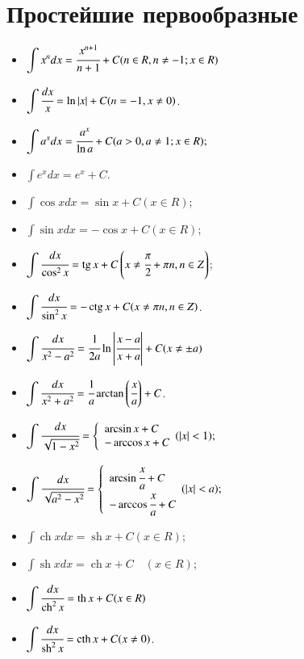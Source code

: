 \documentclass[twoside, a4paperpt]{extarticle}
\begin{document}
\section*{Простейшие первообразные}

\begin{multicols}{2}
    \begin{itemize}
        \item $\displaystyle \int x^{n} d x=\cfrac{x^{n+1}}{n+1}+C(n \in R, n \neq-1 ; x \in R)$
        \item $\displaystyle \int \cfrac{d x}{x}=\ln |x|+C(n=-1, x \neq 0)$.
        \item $\displaystyle \int a^{x} d x=\cfrac{a^{x}}{\ln a}+C(a>0, a \neq 1 ; x \in R) ; $
        \item $\displaystyle \int e^{x} d x=e^{x}+C$.
        \item $\displaystyle \int \cos x d x=\sin x+C(x \in R)$;
        \item $\displaystyle \int \sin x d x=-\cos x+C(x \in R)$;
        \item $\displaystyle \int \cfrac{d x}{\cos ^{2} x}=\operatorname{tg} x+C\left(x \neq \cfrac{\pi}{2}+\pi n, n \in Z\right)$;
        \item $\displaystyle \int \cfrac{d x}{\sin ^{2} x}=-\operatorname{ctg} x+C(x \neq \pi n, n \in Z)$.
        \item $\displaystyle \int \cfrac{d x}{x^{2}-a^{2}}=\cfrac{1}{2 a} \ln \left|\cfrac{x-a}{x+a}\right|+C(x \neq \pm a)$
        \item $\displaystyle \int \cfrac{d x}{x^{2}+a^{2}}=\cfrac{1}{a} \arctan \left(\cfrac{x}{a}\right)+C$.
        \item $\displaystyle \int \cfrac{d x}{\sqrt{1-x^{2}}}=\left\{\begin{array}{l}\arcsin x+C \\ -\arccos x+C\end{array}(|x|<1) ;\right.$
        \item $\displaystyle \int \cfrac{d x}{\sqrt{a^{2}-x^{2}}}=\left\{\begin{array}{l}\arcsin \cfrac{x}{a}+C \\ -\arccos \cfrac{x}{a}+C\end{array}(|x|<a) ;\right.$ 
        \item $\displaystyle \int \operatorname{ch} x d x=\operatorname{sh} x+C(x \in R) ; \quad$
        \item $\displaystyle \int \operatorname{sh} x d x=\operatorname{ch} x+C \quad(x \in R)$;
        \item $\displaystyle \int \cfrac{d x}{\operatorname{ch}^{2} x}=\operatorname{th} x+C(x \in R)$
        \item $\displaystyle \int \cfrac{d x}{\operatorname{sh}^{2} x}=\operatorname{cth} x+C(x \neq 0)$.
    \end{itemize}
\end{multicols}
\end{document}
